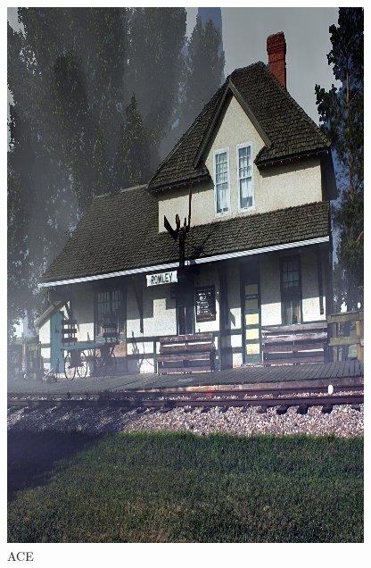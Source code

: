 \documentclass[12pt]{article}
\begin{document}
\begin{figure}[!h]
\begin{minipage}[t]{0.24\linewidth}
        \includegraphics[width=0.9\linewidth]{sample_pictures/after_HazeRD_ACE.jpg}
        \caption*{ACE}
    \end{minipage}\begin{minipage}[t]{0.24\linewidth}
        \centering

\end{minipage}
\end{figure}
\end{document}
